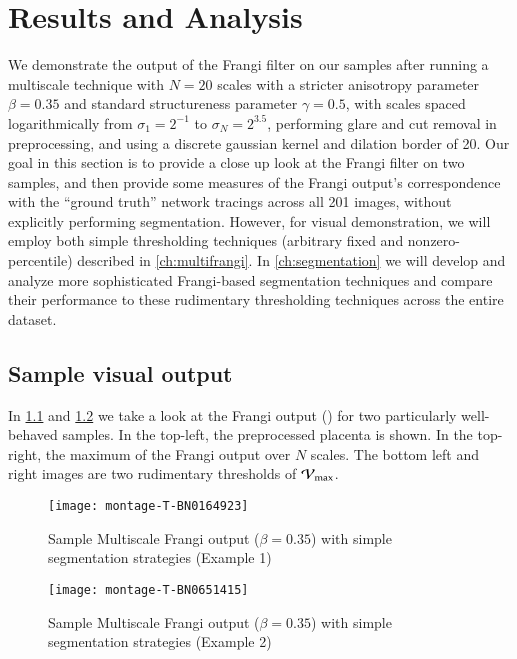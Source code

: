 \chapter{Results and Analysis} \label{ch:results-analysis}

We demonstrate the output of the Frangi filter on our samples after running a multiscale technique with $N=20$ scales with a stricter anisotropy parameter $\beta = 0.35$ and standard structureness parameter $\gamma=0.5$,
with scales spaced logarithmically from $\sigma_1 = 2^{-1}$ to $\sigma_N = 2^{3.5}$, performing glare and cut removal in preprocessing, and using a discrete gaussian kernel and dilation border of 20.
Our goal in this section is to provide a close up look at the Frangi filter on two samples, and then provide some measures of the Frangi output's correspondence with the ``ground truth'' network tracings across all 201 images, without explicitly performing segmentation. However, for visual demonstration, we will employ both simple thresholding techniques (arbitrary fixed and nonzero-percentile) described in \cref{ch:multifrangi}. In \cref{ch:segmentation} we will develop and analyze more sophisticated Frangi-based segmentation techniques and compare their performance to these rudimentary thresholding techniques across the entire dataset.

\section{Sample visual output}
In \cref{fig:output-montage-example1} and \cref{fig:output-montage-example2} we take a look at the Frangi output (\Vmax) for two particularly well-behaved samples. In the top-left, the preprocessed placenta is shown. In the top-right, the maximum of the Frangi output over $N$ scales. The bottom left and right images are two rudimentary thresholds of $\mathcal{V}_{\max}$.

\begin{figure} \centering
  \texttt{[image: montage-T-BN0164923]}
  \caption{Sample Multiscale Frangi output ($\beta=0.35$) with simple segmentation strategies (Example 1)}
  \label{fig:output-montage-example1}
\end{figure}

\begin{figure} \centering
  \texttt{[image: montage-T-BN0651415]}
  \caption{Sample Multiscale Frangi output ($\beta=0.35$) with simple segmentation strategies (Example 2)}
  \label{fig:output-montage-example2}
\end{figure}


